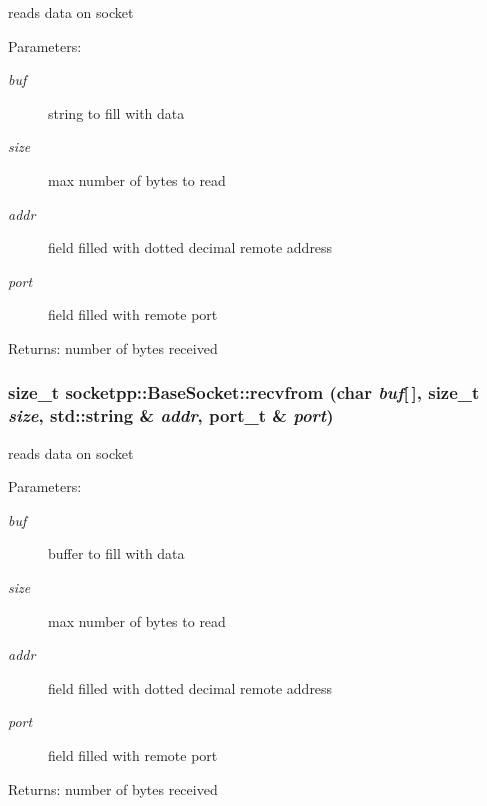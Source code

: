 \begin{CompactItemize}
reads data on socket 

\begin{Desc}
\item[Parameters:]
\begin{description}
\item[{\em buf}]string to fill with data \item[{\em size}]max number of bytes to read \item[{\em addr}]field filled with dotted decimal remote address \item[{\em port}]field filled with remote port \end{description}
\end{Desc}
\begin{Desc}
\item[Returns:]number of bytes received \end{Desc}
\hypertarget{classsocketpp_1_1BaseSocket_205fc515468a3df01258f7ebd6fdf38c}{
\subsubsection[{recvfrom}]{\setlength{\rightskip}{0pt plus 5cm}size\_\-t socketpp::BaseSocket::recvfrom (char {\em buf}\mbox{[}$\,$\mbox{]}, \/  size\_\-t {\em size}, \/  std::string \& {\em addr}, \/  {\bf port\_\-t} \& {\em port})}}
\label{classsocketpp_1_1BaseSocket_205fc515468a3df01258f7ebd6fdf38c}


reads data on socket 

\begin{Desc}
\item[Parameters:]
\begin{description}
\item[{\em buf}]buffer to fill with data \item[{\em size}]max number of bytes to read \item[{\em addr}]field filled with dotted decimal remote address \item[{\em port}]field filled with remote port \end{description}
\end{Desc}
\begin{Desc}
\item[Returns:]number of bytes received \end{Desc}
\hypertarget{classsocketpp_1_1BaseSocket_d2656c57d84c4ff032cd3d9ad4608bfa}{
}
\end{CompactItemize}
